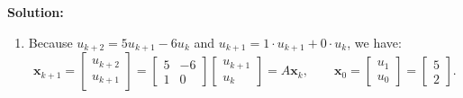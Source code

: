 \documentclass[11pt, letterpaper]{article}
\theoremstyle{definition}
\theoremstyle{remark}
\begin{document}
\textbf{Solution:}
\begin{enumerate}[label=(\alph*)]
    \item Because $u_{k+2} = 5u_{k+1} - 6u_{k}$ and $u_{k+1} = 1\cdot u_{k+1} + 0\cdot u_{k}$, we have:
    \[
    \mathbf{x}_{k+1} = \begin{bmatrix} u_{k+2} \\ u_{k+1} \end{bmatrix} = \begin{bmatrix} 5 & -6 \\ 1 & 0 \end{bmatrix}\begin{bmatrix} u_{k+1} \\ u_{k} \end{bmatrix} = A\mathbf{x}_{k}, \qquad \mathbf{x}_{0} = \begin{bmatrix} u_{1} \\ u_{0} \end{bmatrix} = \begin{bmatrix} 5 \\ 2 \end{bmatrix}.
    \]


\end{enumerate}
\end{document}
